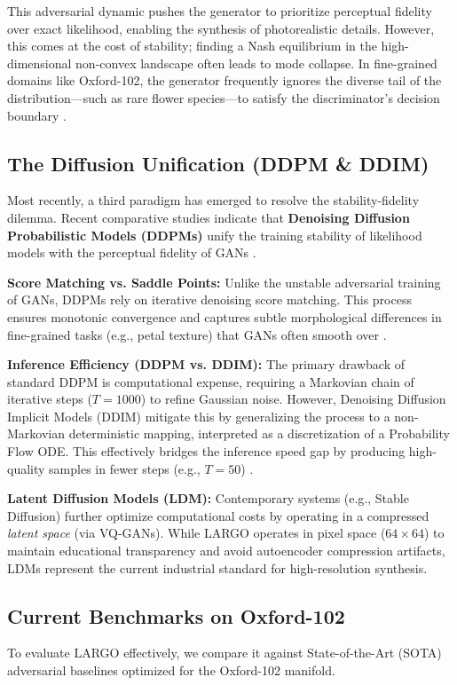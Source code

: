 \documentclass[12pt, a4paper]{article}
\begin{document}
This adversarial dynamic pushes the generator to prioritize perceptual fidelity over exact likelihood, enabling the synthesis of photorealistic details. However, this comes at the cost of stability; finding a Nash equilibrium in the high-dimensional non-convex landscape often leads to mode collapse. In fine-grained domains like Oxford-102, the generator frequently ignores the diverse tail of the distribution—such as rare flower species—to satisfy the discriminator's decision boundary \cite{stylegan, oxford102}.

\subsection{The Diffusion Unification (DDPM \& DDIM)}
Most recently, a third paradigm has emerged to resolve the stability-fidelity dilemma. Recent comparative studies indicate that \textbf{Denoising Diffusion Probabilistic Models (DDPMs)} unify the training stability of likelihood models with the perceptual fidelity of GANs \cite{dhariwal2021}.

\textbf{Score Matching vs. Saddle Points:} 
Unlike the unstable adversarial training of GANs, DDPMs rely on iterative denoising score matching. This process ensures monotonic convergence and captures subtle morphological differences in fine-grained tasks (e.g., petal texture) that GANs often smooth over \cite{arxiv2006}.

\textbf{Inference Efficiency (DDPM vs. DDIM):} 
The primary drawback of standard DDPM is computational expense, requiring a Markovian chain of iterative steps ($T=1000$) to refine Gaussian noise. However, Denoising Diffusion Implicit Models (DDIM) mitigate this by generalizing the process to a non-Markovian deterministic mapping, interpreted as a discretization of a Probability Flow ODE. This effectively bridges the inference speed gap by producing high-quality samples in fewer steps (e.g., $T=50$) \cite{song_ddim}.

\textbf{Latent Diffusion Models (LDM):}
Contemporary systems (e.g., Stable Diffusion) further optimize computational costs by operating in a compressed \textit{latent space} (via VQ-GANs). While LARGO operates in pixel space ($64 \times 64$) to maintain educational transparency and avoid autoencoder compression artifacts, LDMs represent the current industrial standard for high-resolution synthesis.

\subsection{Current Benchmarks on Oxford-102}
To evaluate LARGO effectively, we compare it against State-of-the-Art (SOTA) adversarial baselines optimized for the Oxford-102 manifold.
\end{document}
